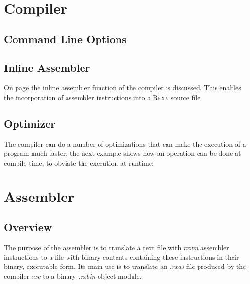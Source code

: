 \chapter{\crexx{} Compiler}
\section{Command Line Options}
\begin{shaded}
  \small
  \obeylines {}
 \end{shaded}
 \section{Inline Assembler}
 On page \pageref{inlineAssembly} the inline assembler function of
 the \crexx{} compiler is discussed. This enables the incorporation
 of  assembler instructions into a \textsc{Rexx} source
 file.

\section{Optimizer}\label{fpowexample}
 The compiler can do a number of optimizations that can make the
 execution of a program much faster; the next example shows how an
 operation can be done at compile time, to obviate the execution at
 runtime:

\begin{shaded}
  \small
\obeylines {}
\end{shaded}

 
\chapter{\crexx{} Assembler}
\section{Overview}
The purpose of the \crexx{} assembler  is to translate a text file with
\emph{rxvm} assembler instructions to a file with binary contents containing these
instructions in their binary, executable form. Its main use is to
translate an \emph{.rxas} file produced by the \crexx{} compiler
\emph{rxc} to a binary \emph{.rxbin} object module.

